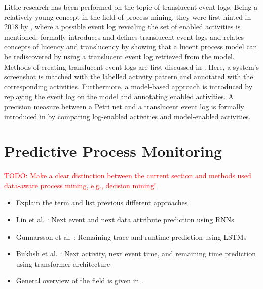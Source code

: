 Little research has been performed on the topic of translucent event logs. Being a relatively young concept in the field of process mining, they were first hinted in 2018 by \cite{lucency-first-paper}, where a possible event log revealing the set of enabled activities is mentioned. \cite{Translucent-event-logs-first-paper} formally introduces and defines translucent event logs and relates concepts of lucency and translucency by showing that a lucent process model can be rediscovered by using a translucent event log retrieved from the model. Methods of creating translucent event logs are first discussed in \cite{creating-translucent-event-logs}. Here, a system's screenshot is matched with the labelled activity pattern and annotated with the corresponding activities. Furthermore, a model-based approach is introduced by replaying the event log on the model and annotating enabled activities. A precision measure between a Petri net and a translucent event log is formally introduced in \cite{translucent-precision} by comparing log-enabled activities and model-enabled activities.

\section{Predictive Process Monitoring}

\textcolor{red}{TODO: Make a clear distinction between the current section and methods used data-aware process mining, e.g., decision mining!}

\begin{itemize}
    \item Explain the term and list previous different approaches
    \item Lin et al. \cite{predictive-process-monitoring-rnn}: Next event and next data attribute prediction using RNNs
    \item Gunnarsson et al. \cite{predictive-process-monitoring-lstm}: Remaining trace and runtime prediction using LSTMs
    \item Bukhsh et al. \cite{predictive-process-monitoring-transformer}: Next activity, next event time, and remaining time prediction using transformer architecture
    \item General overview of the field is given in \cite{predictive-process-monitoring}.
\end{itemize}